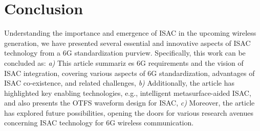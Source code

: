 \documentclass[journal, comsoc]{IEEEtran}
\begin{document}
\section{Conclusion}
{Understanding the importance and emergence of ISAC in the upcoming wireless generation, we have presented several essential and innovative aspects of ISAC technology from a 6G standardization purview. Specifically, this work can be concluded as: \textit{a)} This article summariz	es 6G requirements and the vision of ISAC integration, covering various aspects of 6G standardization, advantages of ISAC co-existence, and related challenges, \textit{b)} Additionally, the article has highlighted key enabling technologies, e.g., intelligent metasurface-aided ISAC, and also presents the OTFS waveform design for ISAC, \textit{c)} Moreover, the article has explored future possibilities, opening the doors for various research avenues concerning ISAC technology for 6G wireless communication.}











\end{document}
